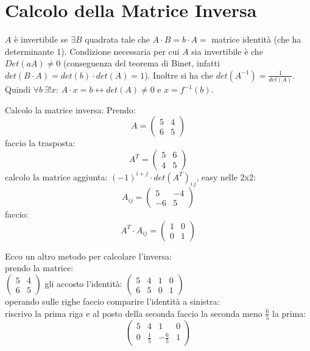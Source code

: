 \documentclass[a4paper,12pt, oneside]{book}
\begin{document}
\section{Calcolo della Matrice Inversa}
$A$ è invertibile se $\exists B$ quadrata tale che $A\cdot B= b\cdot A=$ matrice identità (che ha determinante 1). Condizione necessaria per cui $A$ sia invertibile è che $Det(aA)\neq 0$ (conseguenza del teorema di Binet, infatti $det(B\cdot A)=det(b)\cdot det(A)=1$). Inoltre si ha che $det(A^{-1})=\frac{1}{det(A)}$. Quindi $\forall b\, \exists !x:\, A\cdot x=b\longleftrightarrow det(A)\neq 0$ e $x=f^{-1}(b)$. 
\begin{esempio}
Calcolo la matrice inversa:
Prendo:
$$
A=\left(\begin{matrix}
5 & 4\\
6 & 5
\end{matrix}\right)
$$
faccio la trasposta:
$$
A^T=\left(\begin{matrix}
5 & 6\\
4 & 5
\end{matrix}\right)
$$
calcolo la matrice aggiunta: $(-1)^{i+j}\cdot det(A^T)_{i\,j}$, easy nelle 2x2:
$$
A_{ij}=\left(\begin{matrix}
5 & -4\\
-6 & 5
\end{matrix}\right)
$$
faccio:
$$
A^T\cdot A_{ij}= \left(\begin{matrix}
1 & 0\\
0 & 1
\end{matrix}\right)
$$
\end{esempio}
Ecco un altro metodo per calcolare l'inversa:\\
prendo la matrice:\\
$
\left(\begin{matrix}
5 & 4\\
6 & 5
\end{matrix}\right)
$
gli accosto l'identità:
$
\left(\begin{matrix}
5 & 4 & 1 & 0\\
6 & 5 & 0 & 1
\end{matrix}\right)
$\\
operando sulle righe faccio comparire l'identità a sinistra:\\
riscrivo la prima riga e al posto della seconda faccio la seconda meno $\frac{6}{5}$ la prima:
$$
\left(\begin{matrix}
5 & 4 & 1 & 0\\
0 & \frac{1}{5} & -\frac{6}{5} & 1
\end{matrix}\right)
$$
\end{document}
